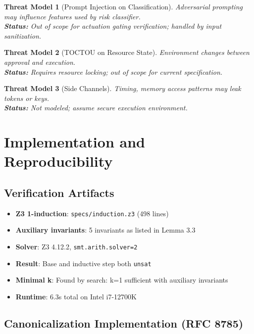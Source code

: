 \documentclass[12pt]{article}
\newtheorem{threat}{Threat Model}[section]
\begin{document}
\begin{threat}[Prompt Injection on Classification]
Adversarial prompting may influence features used by risk classifier.\\
\textbf{Status:} Out of scope for actuation gating verification; handled by input sanitization.
\end{threat}

\begin{threat}[TOCTOU on Resource State]
Environment changes between approval and execution.\\
\textbf{Status:} Requires resource locking; out of scope for current specification.
\end{threat}

\begin{threat}[Side Channels]
Timing, memory access patterns may leak tokens or keys.\\
\textbf{Status:} Not modeled; assume secure execution environment.
\end{threat}

\section{Implementation and Reproducibility}

\subsection{Verification Artifacts}

\begin{itemize}
    \item \textbf{Z3 1-induction}: \texttt{specs/induction.z3} (498 lines)
    \item \textbf{Auxiliary invariants}: 5 invariants as listed in Lemma 3.3
    \item \textbf{Solver}: Z3 4.12.2, \texttt{smt.arith.solver=2}
    \item \textbf{Result}: Base and inductive step both \texttt{unsat}
    \item \textbf{Minimal k}: Found by search: k=1 sufficient with auxiliary invariants
    \item \textbf{Runtime}: 6.3s total on Intel i7-12700K
\end{itemize}

\subsection{Canonicalization Implementation (RFC 8785)}
\end{document}
